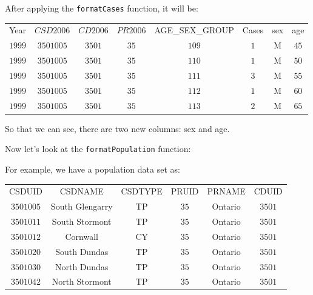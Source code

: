 \documentclass{article}
\begin{document}
After applying the \texttt{formatCases} function, it will be:
\begin{table}[ht]
\begin{center}
\begin{tabular}{cccccccc}
 Year& $CSD2006$ & $CD2006$ & $PR2006$ & AGE\_SEX\_GROUP &Cases &sex &age    \\
 $1999$& $3501005 $ & $3501 $  &  $35 $     &     $109$   &  $1$ &  M  &$45$ \\
 $1999$& $3501005 $ & $3501 $  &  $35 $     &     $110$   &  $1$ &  M  &$50$ \\
 $1999$& $3501005 $ & $3501 $  &  $35 $     &     $111$   &  $3$ &  M  &$55$ \\
 $1999$& $3501005 $ & $3501 $  &  $35 $     &     $112$   &  $1$ &  M  &$60$ \\
 $1999$& $3501005 $ & $3501 $  &  $35 $     &     $113$   &  $2$ &  M  &$65$ \\
 \end{tabular}
\end{center}
\end{table}

So that we can see, there are two new columns: sex and age.

Now let's look at the \texttt{formatPopulation} function:

For example, we have a population data set as:

\begin{table}[ht]
\begin{center}
\begin{tabular}{cccccc}

  CSDUID   &     CSDNAME  & CSDTYPE & PRUID  & PRNAME & CDUID \\
 $3501005$ & South Glengarry  &    TP  & $35$ &Ontario & $3501$ \\
 $3501011$ & South Stormont   &   TP   & $35$ &Ontario & $3501$  \\
 $3501012$ &      Cornwall    &  CY    &$35$  &Ontario & $3501$  \\
 $3501020$ &  South Dundas    &  TP    &$35$  &Ontario & $3501$  \\
 $3501030$ &  North Dundas    &  TP    &$35$  &Ontario & $3501$  \\
 $3501042$ &  North Stormont  &    TP  &  $35$& Ontario&  $3501$ \\

\end{tabular}
\end{center}
\end{table}
\end{document}
